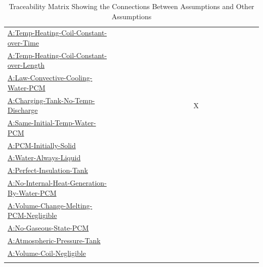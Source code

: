 \documentclass[12pt]{article}
\begin{document}
\begin{longtable}{l l l l l l l l l l l l l l l l l l l l l}
\\
\hyperref[assumpTHCCoT]{A:Temp-Heating-Coil-Constant-over-Time} &  &  &  &  &  &  &  &  &  &  &  &  &  &  &  &  &  &  &  & 
\\
\hyperref[assumpTHCCoL]{A:Temp-Heating-Coil-Constant-over-Length} &  &  &  &  &  &  &  &  &  &  &  &  &  &  &  &  &  &  &  & 
\\
\hyperref[assumpLCCWP]{A:Law-Convective-Cooling-Water-PCM} &  &  &  &  &  &  &  &  &  &  &  &  &  &  &  &  &  &  &  & 
\\
\hyperref[assumpCTNOD]{A:Charging-Tank-No-Temp-Discharge} &  &  &  &  &  &  &  &  &  &  &  & X &  &  &  &  &  &  &  & 
\\
\hyperref[assumpSITWP]{A:Same-Initial-Temp-Water-PCM} &  &  &  &  &  &  &  &  &  &  &  &  &  &  &  &  &  &  &  & 
\\
\hyperref[assumpPIS]{A:PCM-Initially-Solid} &  &  &  &  &  &  &  &  &  &  &  &  &  &  &  &  &  &  &  & 
\\
\hyperref[assumpWAL]{A:Water-Always-Liquid} &  &  &  &  &  &  &  &  &  &  &  &  &  &  &  &  &  &  &  & 
\\
\hyperref[assumpPIT]{A:Perfect-Insulation-Tank} &  &  &  &  &  &  &  &  &  &  &  &  &  &  &  &  &  &  &  & 
\\
\hyperref[assumpNIHGBWP]{A:No-Internal-Heat-Generation-By-Water-PCM} &  &  &  &  &  &  &  &  &  &  &  &  &  &  &  &  &  &  &  & 
\\
\hyperref[assumpVCMPN]{A:Volume-Change-Melting-PCM-Negligible} &  &  &  &  &  &  &  &  &  &  &  &  &  &  &  &  &  &  &  & 
\\
\hyperref[assumpNGSP]{A:No-Gaseous-State-PCM} &  &  &  &  &  &  &  &  &  &  &  &  &  &  &  &  &  &  &  & 
\\
\hyperref[assumpAPT]{A:Atmospheric-Pressure-Tank} &  &  &  &  &  &  &  &  &  &  &  &  &  &  &  &  &  &  &  & 
\\
\hyperref[assumpVCN]{A:Volume-Coil-Negligible} &  &  &  &  &  &  &  &  &  &  &  &  &  &  &  &  &  &  &  & 
\\
\bottomrule
\caption{Traceability Matrix Showing the Connections Between Assumptions and Other Assumptions}
\label{Table:TraceMatAvsA}
\end{longtable}
\end{document}
